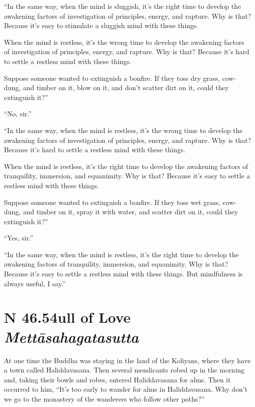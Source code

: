 \documentclass[12pt,openany]{book}%
\newcommand*{\suttatitleacronym}[1]{\smaller[2]{#1}\vspace*{.3em}}
\newcommand*{\suttatitletranslation}[1]{\linebreak{#1}}
\newcommand*{\suttatitleroot}[1]{\linebreak\smaller[2]\itshape{#1}}
\newcommand*{\tocacronym}[1]{\hspace*{-3.3em}{#1}\quad}
\newcommand*{\toctranslation}[1]{#1}
\newcommand*{\tocroot}[1]{(\textit{#1})}
\begin{document}
“In the same way, when the mind is sluggish, it’s the right time to develop the awakening factors of investigation of principles, energy, and rapture. Why is that? Because it’s easy to stimulate a sluggish mind with these things. 

When the mind is restless, it’s the wrong time to develop the awakening factors of investigation of principles, energy, and rapture. Why is that? Because it’s hard to settle a restless mind with these things. 

Suppose someone wanted to extinguish a bonfire. If they toss dry grass, cow-dung, and timber on it, blow on it, and don’t scatter dirt on it, could they extinguish it?” 

“No, sir.” 

“In the same way, when the mind is restless, it’s the wrong time to develop the awakening factors of investigation of principles, energy, and rapture. Why is that? Because it’s hard to settle a restless mind with these things. 

When the mind is restless, it’s the right time to develop the awakening factors of tranquility, immersion, and equanimity. Why is that? Because it’s easy to settle a restless mind with these things. 

Suppose someone wanted to extinguish a bonfire. If they toss wet grass, cow-dung, and timber on it, spray it with water, and scatter dirt on it, could they extinguish it?” 

“Yes, sir.” 

“In the same way, when the mind is restless, it’s the right time to develop the awakening factors of tranquility, immersion, and equanimity. Why is that? Because it’s easy to settle a restless mind with these things. But mindfulness is always useful, I say.” 

%
\section*{{\suttatitleacronym SN 46.54}{\suttatitletranslation Full of Love }{\suttatitleroot Mettāsahagatasutta}}
\addcontentsline{toc}{section}{\tocacronym{SN 46.54} \toctranslation{Full of Love } \tocroot{Mettāsahagatasutta}}

At one time the Buddha was staying in the land of the Koliyans, where they have a town called Haliddavasana. Then several mendicants robed up in the morning and, taking their bowls and robes, entered Haliddavasana for alms. Then it occurred to him, “It’s too early to wander for alms in Haliddavasana. Why don’t we go to the monastery of the wanderers who follow other paths?” 
\end{document}
